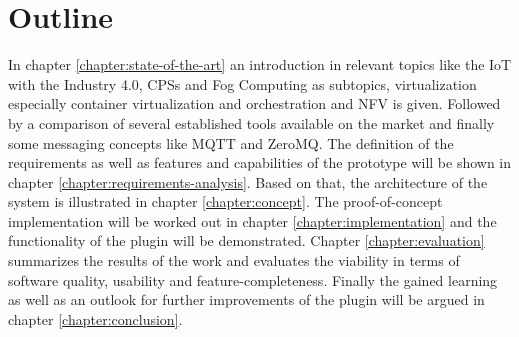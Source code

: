 \section{Outline}
In chapter \ref{chapter:state-of-the-art} an introduction in relevant topics like the \ac{IoT} with the Industry 4.0, \acp{CPS} and Fog Computing as subtopics, virtualization especially container virtualization and orchestration and \ac{NFV} is given.
Followed by a comparison of several established tools available on the market and finally some messaging concepts like \ac{MQTT} and ZeroMQ.
The definition of the requirements as well as features and capabilities of the prototype will be shown in chapter \ref{chapter:requirements-analysis}.
Based on that, the architecture of the system is illustrated in chapter \ref{chapter:concept}.
The proof-of-concept implementation will be worked out in chapter \ref{chapter:implementation} and the functionality of the plugin will be demonstrated.
Chapter \ref{chapter:evaluation} summarizes the results of the work and evaluates the viability in terms of software quality, usability and feature-completeness.
Finally the gained learning as well as an outlook for further improvements of the plugin will be argued in chapter \ref{chapter:conclusion}.


